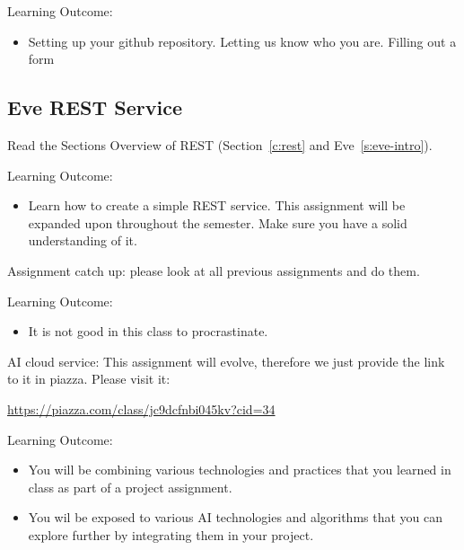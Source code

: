 Learning Outcome:
\begin{itemize}
\item Setting up your github repository. Letting us know who you
  are. Filling out a form
\end{itemize}


\subsection{Eve REST Service}
\label{E:rest-eve}
\begin{exercise}
Read the Sections Overview of REST (Section~\ref{c:rest} and
Eve~\ref{s:eve-intro}).

\end{exercise}

Learning Outcome:
\begin{itemize}
\item Learn how to create a simple REST service. This assignment will
  be expanded upon throughout the semester. Make sure you have a solid
  understanding of it.
\end{itemize}

\begin{exercise}
Assignment catch up: please look at all previous assignments and do
them. 

\end{exercise}

Learning Outcome:
\begin{itemize}
\item It is not good in this class to procrastinate.
\end{itemize}

\begin{exercise}

AI cloud service: This assignment will evolve, therefore we just
provide the link to it in piazza. Please visit it:

\url{https://piazza.com/class/jc9dcfnbi045kv?cid=34}

\end{exercise}

Learning Outcome:
\begin{itemize}
\item You will be combining various technologies and practices that
  you learned in class as part of a project assignment.
\item You wil be exposed to various AI technologies and algorithms
  that you can explore further by integrating them in your project.
\end{itemize}



